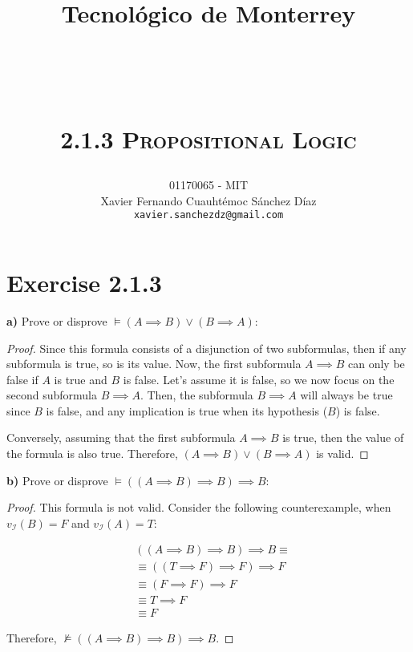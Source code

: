 \documentclass[titlepage, letterpaper, fleqn]{article}
\title{
\vspace{1in}
\textbf{Tecnológico de Monterrey} \\
\vspace{0.5in}
\textmd{\mahclass} \\
\large{\textit{\mahteacher}} \\
\vspace{0.5in}
\textsc{\mahtitle}\\
\textsc{2.1.3 Propositional Logic}\\
\author{01170065  - MIT \\
Xavier Fernando Cuauhtémoc Sánchez Díaz \\
\texttt{xavier.sanchezdz@gmail.com}}
\date{\mahdate}
}
\newcommand{\spacepls}{\vspace{5mm}}
\begin{document}
\begin{titlepage}
\maketitle
\end{titlepage}

%
%

\section{Exercise 2.1.3}

{\large \textbf{a)} Prove or disprove \(\models (A \implies B) \vee (B \implies A)\):}

\begin{proof}
Since this formula consists of a disjunction of two subformulas, then if any subformula is true, so is its value.
Now, the first subformula \(A \implies B\) can only be false if \(A\) is true and \(B\) is false.
Let's assume it is false, so we now focus on the second subformula \(B \implies A\).
Then, the subformula \(B \implies A\) will always be true since \(B\) is false, and any implication is true when its hypothesis (\(B\)) is false.

Conversely, assuming that the first subformula \(A \implies B\) is true, then the value of the formula is also true.
Therefore, \((A \implies B) \vee (B \implies A)\) is valid.
\end{proof}

\spacepls

{\large \textbf{b)} Prove or disprove \(\models((A \implies B) \implies B) \implies B\):}

\begin{proof}
This formula is not valid. Consider the following counterexample, when \(v_{\mathscr{I}}(B) = F\) and \(v_{\mathscr{I}}(A) = T\):

\begin{align*}
& ((A \implies B) \implies B) \implies B \equiv \\
& \equiv ((T \implies F) \implies F) \implies F\\
& \equiv (F \implies F) \implies F\\
& \equiv T \implies F\\
& \equiv F
\end{align*}

Therefore, \(\not \models ((A \implies B) \implies B) \implies B\).
\end{proof}
\end{document}
